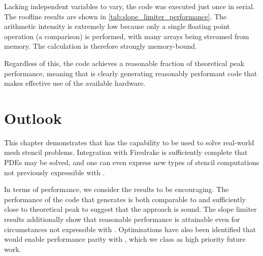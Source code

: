 \documentclass[thesis]{subfiles}
\begin{document}
Lacking independent variables to vary, the code was executed just once in serial.
The roofline results are shown in \cref{tab:slope_limiter_performance}.
The arithmetic intensity is extremely low because only a single floating point operation (a comparison) is performed, with many arrays being streamed from memory.
The calculation is therefore strongly memory-bound.

Regardless of this, the code achieves a reasonable fraction of theoretical peak performance, meaning that  is clearly generating reasonably performant code that makes effective use of the available hardware.

\section{Outlook}

This chapter demonstrates that  has the capability to be used to solve real-world mesh stencil problems.
Integration with Firedrake is sufficiently complete that PDEs may be solved, and one can even express new types of stencil computations not previously expressible with .

In terms of performance, we consider the results to be encouraging.
The performance of the code that  generates is both comparable to  and sufficiently close to theoretical peak to suggest that the approach is sound.
The slope limiter results additionally show that reasonable performance is attainable even for circumstances not expressible with .
Optimisations have also been identified that would enable performance parity with , which we class as high priority future work.
\end{document}
